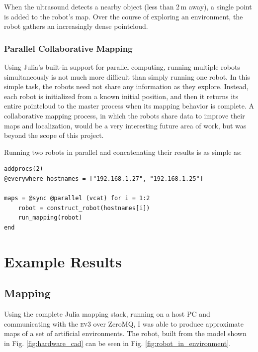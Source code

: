 \documentclass[]{article}
\newcommand{\ev}{\textsc{ev3}}
\begin{document}
When the ultrasound detects a nearby object (less than 2\,m away), a single point is added to the robot's map. Over the course of exploring an environment, the robot gathers an increasingly dense pointcloud. 

\subsubsection{Parallel Collaborative Mapping}

Using Julia's built-in support for parallel computing, running multiple robots simultaneously is not much more difficult than simply running one robot. In this simple task, the robots need not share any information as they explore. Instead, each robot is initialized from a known initial position, and then it returns its entire pointcloud to the master process when its mapping behavior is complete. A collaborative mapping process, in which the robots share data to improve their maps and localization, would be a very interesting future area of work, but was beyond the scope of this project. 

Running two robots in parallel and concatenating their results is as simple as:

\begin{verbatim}
addprocs(2)
@everywhere hostnames = ["192.168.1.27", "192.168.1.25"]

maps = @sync @parallel (vcat) for i = 1:2
    robot = construct_robot(hostnames[i])
    run_mapping(robot)
end
\end{verbatim}

\section{Example Results}

\subsection{Mapping}

Using the complete Julia mapping stack, running on a host PC and communicating with the \ev{} over ZeroMQ, I was able to produce approximate maps of a set of artificial environments. The robot, built from the model shown in Fig. \ref{fig:hardware_cad} can be seen in Fig. \ref{fig:robot_in_environment}. 
\end{document}
